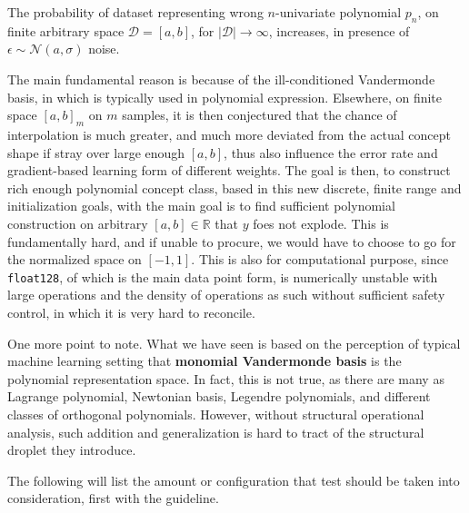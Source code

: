 \begin{conjecture}
    The probability of dataset representing wrong $n$-univariate polynomial $p_{n}$, on finite arbitrary space $\mathcal{D}=[a,b]$, for $|\mathcal{D}|\to\infty$, increases, in presence of $\epsilon\sim\mathcal{N}(a,\sigma)$ noise. 
\end{conjecture}

The main fundamental reason is because of the ill-conditioned Vandermonde basis, in which is typically used in polynomial expression. Elsewhere, on finite space $[a,b]_{m}$ on $m$ samples, it is then conjectured that the chance of interpolation is much greater, and much more deviated from the actual concept shape if stray over large enough $[a,b]$, thus also influence the error rate and gradient-based learning form of different weights. The goal is then, to construct rich enough polynomial concept class, based in this new discrete, finite range and initialization goals, with the main goal is to find sufficient polynomial construction on arbitrary $[a,b]\in\mathbb{R}$ that $y$ foes not explode. This is fundamentally hard, and if unable to procure, we would have to choose to go for the normalized space on $[-1,1]$. This is also for computational purpose, since \texttt{float128}, of which is the main data point form, is numerically unstable with large operations and the density of operations as such without sufficient safety control, in which it is very hard to reconcile. 

One more point to note. What we have seen is based on the perception of typical machine learning setting that \textbf{monomial Vandermonde basis} is the polynomial representation space. In fact, this is not true, as there are many as Lagrange polynomial, Newtonian basis, Legendre polynomials, and different classes of orthogonal polynomials. However, without structural operational analysis, such addition and generalization is hard to tract of the structural droplet they introduce. 

The following will list the amount or configuration that test should be taken into consideration, first with the guideline. 

